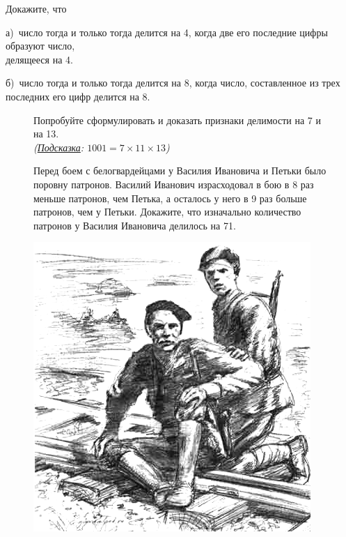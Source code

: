 
\begin{thm}Докажите, что
    \par
    а)~число тогда и только тогда делится на 4, когда две его последние цифры образуют число, \\ делящееся на 4.
    \par
    б)~число тогда и только тогда делится на 8, когда число, составленное из трех последних его цифр делится на 8.
\end{thm}



{
\setlength{\intextsep}{0pt}
\begin{figure}[h]
\begin{minipage}[h]{0.72\linewidth}\setlength{\parindent}{1.5em}
\begin{thm}
    Попробуйте сформулировать и доказать признаки делимости на 7 и на 13.
    \\ 
    {\footnotesize\textit{(\underline{Подсказка}: $1001=7\times11\times13$)}}
\end{thm}
    \begin{thm}
    Перед боем с белогвардейцами у Василия Ивановича и Петьки было поровну патронов. Василий Иванович израсходовал в бою в 8 раз меньше патронов, чем Петька, а осталось у него в 9 раз больше патронов, чем у Петьки. Докажите, что изначально количество патронов у Василия Ивановича делилось на 71. 
    \end{thm}
\end{minipage}
\hfill
\begin{minipage}[h]{0.25\linewidth}
    \includegraphics[width=0.9\columnwidth]{./img/soldat}
\end{minipage}

\end{figure}
}

